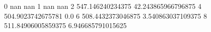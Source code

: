 0 nan nan
1 nan nan
2 547.146240234375 42.243865966796875
4 504.9023742675781 0.0
6 508.4432373046875 3.540863037109375
8 511.84906005859375 6.946685791015625
